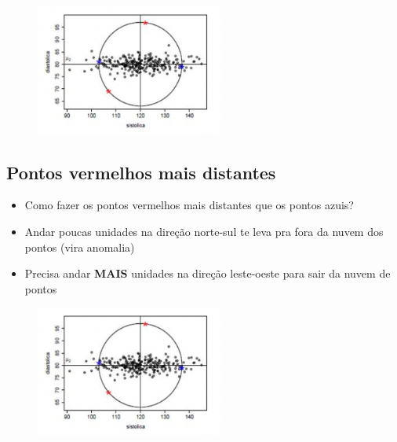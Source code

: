 \documentclass[
  letterpaper,
  DIV=11,
  numbers=noendperiod]{scrartcl}
\providecommand{\tightlist}{%
  \setlength{\itemsep}{0pt}\setlength{\parskip}{0pt}}\usepackage{longtable,booktabs,array}
\begin{document}
\begin{figure}

{\centering \includegraphics[width=0.55\textwidth,height=\textheight]{figs/Aula07/distancia_centro.png}

}

\end{figure}

\hypertarget{pontos-vermelhos-mais-distantes}{%
\subsection{Pontos vermelhos mais
distantes}\label{pontos-vermelhos-mais-distantes}}

\begin{itemize}
\tightlist
\item
  Como fazer os pontos vermelhos mais distantes que os pontos azuis?
\item
  Andar poucas unidades na direção norte-sul te leva pra fora da nuvem
  dos pontos (vira anomalia)
\item
  Precisa andar \textbf{MAIS} unidades na direção leste-oeste para sair
  da nuvem de pontos
\end{itemize}

\begin{figure}

{\centering \includegraphics[width=0.55\textwidth,height=\textheight]{figs/Aula07/distancia_centro.png}

}

\end{figure}
\end{document}
